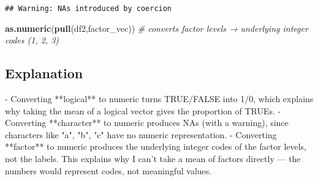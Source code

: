 \documentclass[
]{article}
\newenvironment{Shaded}{\begin{snugshade}}{\end{snugshade}}
\newcommand{\CommentTok}[1]{\textcolor[rgb]{0.56,0.35,0.01}{\textit{#1}}}
\newcommand{\FunctionTok}[1]{\textcolor[rgb]{0.13,0.29,0.53}{\textbf{#1}}}
\newcommand{\NormalTok}[1]{#1}
\newcommand{\SpecialStringTok}[1]{\textcolor[rgb]{0.31,0.60,0.02}{#1}}
\begin{document}
\begin{verbatim}
## Warning: NAs introduced by coercion
\end{verbatim}

\begin{Shaded}
\begin{Highlighting}[]
\FunctionTok{as.numeric}\NormalTok{(}\FunctionTok{pull}\NormalTok{(df2,factor\_vec))    }\CommentTok{\# converts factor levels → underlying integer codes (1, 2, 3)}
\end{Highlighting}
\end{Shaded}

\subsection{Explanation}\label{explanation-1}

\begin{Shaded}
\begin{Highlighting}[]
\SpecialStringTok{{-} }\NormalTok{Converting **logical** to numeric turns TRUE/FALSE into 1/0, which explains why taking the mean of a logical vector gives the proportion of TRUEs.  }
\SpecialStringTok{{-} }\NormalTok{Converting **character** to numeric produces NAs (with a warning), since characters like "a", "b", "c" have no numeric representation.  }
\SpecialStringTok{{-} }\NormalTok{Converting **factor** to numeric produces the underlying integer codes of the factor levels, not the labels. This explains why I can’t take a mean of factors directly — the numbers would represent codes, not meaningful values.  }
\end{Highlighting}
\end{Shaded}
\end{document}
